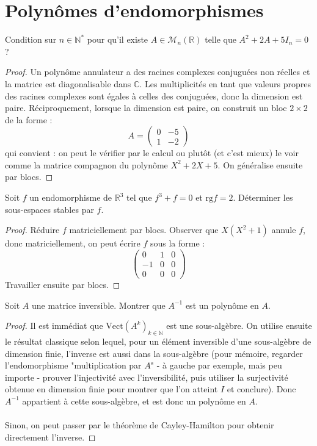 \documentclass[french,a4paper]{article}
\newcommand{\N}{\mathbb{N}}
\newcommand{\R}{\mathbb{R}}
\newcommand{\C}{\mathbb{C}}
\newcommand{\st}{^*}
\newcommand{\inv}{^{-1}}
\theoremstyle{plain}
\theoremstyle{definition}
\theoremstyle{remark}
\begin{document}
\section{Polynômes d'endomorphismes}

\begin{ex}{}
	Condition sur $n\in\N\st$ pour qu'il existe $A\in\mathcal{M}_n(\R)$ telle que $A^2+2A+5I_n=0$ ?
\end{ex}
\begin{proof}
	Un polynôme annulateur a des racines complexes conjuguées non réelles et la matrice est diagonalisable dans $\C$. Les multiplicités en tant que valeurs propres des racines complexes sont égales à celles des conjuguées, donc la dimension est paire. Réciproquement, lorsque la dimension est paire, on construit un bloc $2\times 2$ de la forme : $$A=\begin{pmatrix}
		0&-5\\
		1&-2
	\end{pmatrix}$$ qui convient : on peut le vérifier par le calcul ou plutôt (et c'est mieux) le voir comme la matrice compagnon du polynôme $X^2+2X+5$. On généralise ensuite par blocs.
\end{proof}

\begin{ex}{}
	Soit $f$ un endomorphisme de $\R^3$ tel que $f^3+f=0$ et $\text{rg}f=2$. Déterminer les sous-espaces stables par $f$.
\end{ex}
\begin{proof}
	Réduire $f$ matriciellement par blocs. Observer que $X(X^2+1)$ annule $f$, donc matriciellement, on peut écrire $f$ sous la forme : $$\begin{pmatrix}
		0&1&0\\
		-1&0&0\\
		0&0&0
	\end{pmatrix}$$ Travailler ensuite par blocs.
\end{proof}

\begin{ex}{}
	Soit $A$ une matrice inversible. Montrer que $A\inv$ est un polynôme en $A$.
\end{ex}
\begin{proof}
	Il est immédiat que $\text{Vect}(A^k)_{k\in\N}$ est une sous-algèbre. On utilise ensuite le résultat classique selon lequel, pour un élément inversible d'une sous-algèbre de dimension finie, l'inverse est aussi dans la sous-algèbre (pour mémoire, regarder l'endomorphisme "multiplication par $A$" - à gauche par exemple, mais peu importe - prouver l'injectivité avec l'inversibilité, puis utiliser la surjectivité obtenue en dimension finie pour montrer que l'on atteint $I$ et conclure). Donc $A\inv$ appartient à cette sous-algèbre, et est donc un polynôme en $A$. \\ \\ Sinon, on peut passer par le théorème de Cayley-Hamilton pour obtenir directement l'inverse.
\end{proof}
\end{document}
